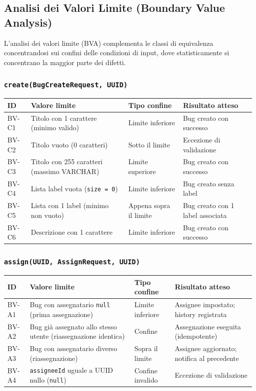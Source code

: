 ﻿\documentclass[a4paper,11pt]{article}
\begin{document}
\subsection{Analisi dei Valori Limite (Boundary Value Analysis)}

L'analisi dei valori limite (BVA) complementa le classi di equivalenza concentrandosi sui confini delle condizioni di input, dove statisticamente si concentrano la maggior parte dei difetti.

\subsubsection{\texttt{create(BugCreateRequest, UUID)}}

\begin{tabular}{|l|p{5.5cm}|p{3cm}|p{4cm}|}
\hline
\textbf{ID} & \textbf{Valore limite} & \textbf{Tipo confine} & \textbf{Risultato atteso} \\
\hline
BV-C1 & Titolo con 1 carattere (minimo valido) & Limite inferiore & Bug creato con successo \\
\hline
BV-C2 & Titolo vuoto (0 caratteri) & Sotto il limite & Eccezione di validazione \\
\hline
BV-C3 & Titolo con 255 caratteri (massimo VARCHAR) & Limite superiore & Bug creato con successo \\
\hline
BV-C4 & Lista label vuota (\texttt{size = 0}) & Limite inferiore & Bug creato senza label \\
\hline
BV-C5 & Lista con 1 label (minimo non vuoto) & Appena sopra il limite & Bug creato con 1 label associata \\
\hline
BV-C6 & Descrizione con 1 carattere & Limite inferiore & Bug creato con successo \\
\hline
\end{tabular}

\subsubsection{\texttt{assign(UUID, AssignRequest, UUID)}}

\begin{tabular}{|l|p{5.5cm}|p{3cm}|p{4cm}|}
\hline
\textbf{ID} & \textbf{Valore limite} & \textbf{Tipo confine} & \textbf{Risultato atteso} \\
\hline
BV-A1 & Bug con assegnatario \texttt{null} (prima assegnazione) & Limite inferiore & Assignee impostato; history registrata \\
\hline
BV-A2 & Bug gi\`a assegnato allo stesso utente (riassegnazione identica) & Confine & Assegnazione eseguita (idempotente) \\
\hline
BV-A3 & Bug con assegnatario diverso (riassegnazione) & Sopra il limite & Assignee aggiornato; notifica al precedente \\
\hline
BV-A4 & \texttt{assigneeId} uguale a UUID nullo (\texttt{null}) & Confine invalido & Eccezione di validazione \\
\hline
\end{tabular}
\end{document}

